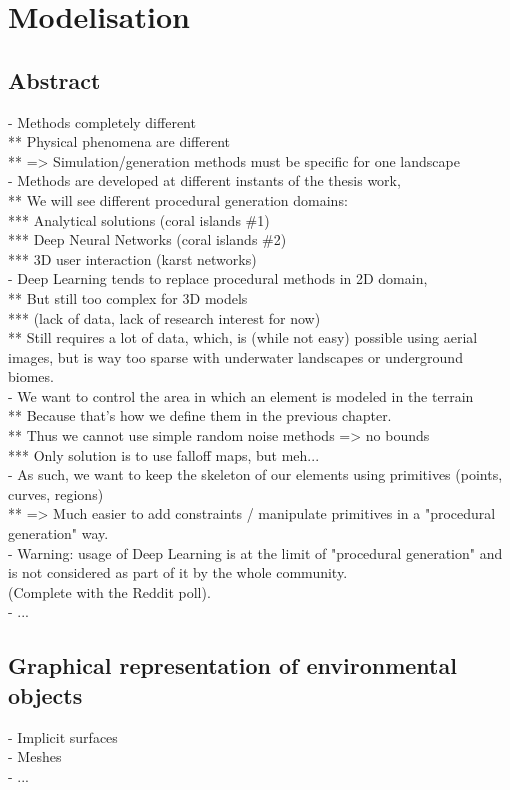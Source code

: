 \part{Modelisation}

\chapter*{Abstract}
\label{chap:modelisation-abstract}
- Methods completely different \\
** Physical phenomena are different \\
** => Simulation/generation methods must be specific for one landscape \\
- Methods are developed at different instants of the thesis work, \\
** We will see different procedural generation domains: \\
*** Analytical solutions (coral islands \#1) \\
*** Deep Neural Networks (coral islands \#2) \\
*** 3D user interaction (karst networks) \\
- Deep Learning tends to replace procedural methods in 2D domain, \\
** But still too complex for 3D models \\
*** (lack of data, lack of research interest for now) \\
** Still requires a lot of data, which, is (while not easy) possible using aerial images, but is way too sparse with underwater landscapes or underground biomes. \\
- We want to control the area in which an element is modeled in the terrain \\
** Because that's how we define them in the previous chapter. \\
** Thus we cannot use simple random noise methods => no bounds \\
*** Only solution is to use falloff maps, but meh... \\
- As such, we want to keep the skeleton of our elements using primitives (points, curves, regions) \\
** => Much easier to add constraints / manipulate primitives in a "procedural generation" way. \\
- Warning: usage of Deep Learning is at the limit of "procedural generation" and is not considered as part of it by the whole community. \\
(Complete with the Reddit poll). \\
- ... 


\chapter{Graphical representation of environmental objects}
\label{chap:representation-env-objects}
- Implicit surfaces \\
- Meshes \\
- ...


% 



